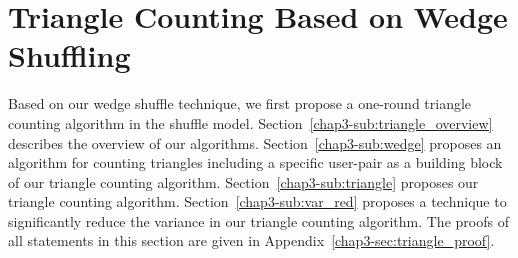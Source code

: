 \section{Triangle Counting Based on Wedge Shuffling}
\label{chap3-sec:triangle}
Based on our wedge shuffle technique, we first propose a 
one-round triangle counting algorithm in the shuffle model. 
% 
Section~\ref{chap3-sub:triangle_overview} describes the overview of our algorithms. 
Section~\ref{chap3-sub:wedge} proposes an algorithm for counting triangles including a specific user-pair 
as a building block of our triangle counting algorithm. 
Section~\ref{chap3-sub:triangle} proposes 
our triangle counting algorithm. 
Section~\ref{chap3-sub:var_red} proposes a technique to significantly reduce the variance in our triangle counting algorithm. 
The proofs of all statements in this section are given in Appendix~\ref{chap3-sec:triangle_proof}. 


